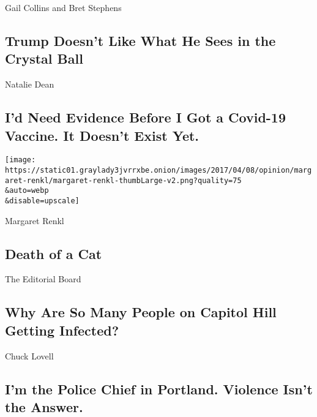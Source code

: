 Gail Collins and Bret Stephens

\hypertarget{trump-doesnt-like-what-he-sees-in-the-crystal-ball}{%
\subsection{Trump Doesn't Like What He Sees in the Crystal
Ball}\label{trump-doesnt-like-what-he-sees-in-the-crystal-ball}}

\href{/2020/08/03/opinion/coronavirus-vaccine-efficacy-trials.html}{}

Natalie Dean

\hypertarget{id-need-evidence-before-i-got-a-covid-19-vaccine-it-doesnt-exist-yet}{%
\subsection{I'd Need Evidence Before I Got a Covid-19 Vaccine. It
Doesn't Exist
Yet.}\label{id-need-evidence-before-i-got-a-covid-19-vaccine-it-doesnt-exist-yet}}

\href{/2020/08/03/opinion/feral-cat-dying.html}{}

\texttt{[image: https://static01.graylady3jvrrxbe.onion/images/2017/04/08/opinion/margaret-renkl/margaret-renkl-thumbLarge-v2.png?quality=75\\\&auto=webp\\\&disable=upscale]}

Margaret Renkl

\hypertarget{death-of-a-cat}{%
\subsection{Death of a Cat}\label{death-of-a-cat}}

\href{/2020/08/02/opinion/coronavirus-gohmert-congress-testing.html}{}

The Editorial Board

\hypertarget{why-are-so-many-people-on-capitol-hill-getting-infected}{%
\subsection{Why Are So Many People on Capitol Hill Getting
Infected?}\label{why-are-so-many-people-on-capitol-hill-getting-infected}}

\href{/2020/08/03/opinion/portland-protests-police-chief.html}{}

Chuck Lovell

\hypertarget{im-the-police-chief-in-portland-violence-isnt-the-answer}{%
\subsection{I'm the Police Chief in Portland. Violence Isn't the
Answer.}\label{im-the-police-chief-in-portland-violence-isnt-the-answer}}

